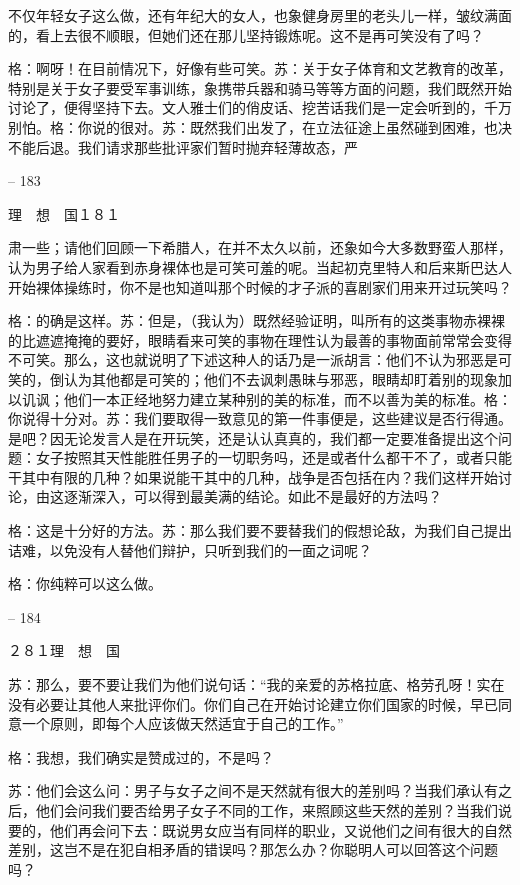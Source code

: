 \documentclass[11pt,oneside]{book}
\begin{document}
\begin{common-format}
    不仅年轻女子这么做，还有年纪大的女人，也象健身房里的老头儿一样，皱纹满面的，看上去很不顺眼，但她们还在那儿坚持锻炼呢。这不是再可笑没有了吗？

    格：啊呀！在目前情况下，好像有些可笑。苏：关于女子体育和文艺教育的改革，特别是关于女子要受军事训练，象携带兵器和骑马等等方面的问题，我们既然开始讨论了，便得坚持下去。文人雅士们的俏皮话、挖苦话我们是一定会听到的，千万别怕。格：你说的很对。苏：既然我们出发了，在立法征途上虽然碰到困难，也决不能后退。我们请求那些批评家们暂时抛弃轻薄故态，严

    

-- 183

    理　想　国１８１

    肃一些；请他们回顾一下希腊人，在并不太久以前，还象如今大多数野蛮人那样，认为男子给人家看到赤身裸体也是可笑可羞的呢。当起初克里特人和后来斯巴达人开始裸体操练时，你不是也知道叫那个时候的才子派的喜剧家们用来开过玩笑吗？

    格：的确是这样。苏：但是，（我认为）既然经验证明，叫所有的这类事物赤裸裸的比遮遮掩掩的要好，眼睛看来可笑的事物在理性认为最善的事物面前常常会变得不可笑。那么，这也就说明了下述这种人的话乃是一派胡言：他们不认为邪恶是可笑的，倒认为其他都是可笑的；他们不去讽刺愚昧与邪恶，眼睛却盯着别的现象加以讥讽；他们一本正经地努力建立某种别的美的标准，而不以善为美的标准。格：你说得十分对。苏：我们要取得一致意见的第一件事便是，这些建议是否行得通。是吧？因无论发言人是在开玩笑，还是认认真真的，我们都一定要准备提出这个问题：女子按照其天性能胜任男子的一切职务吗，还是或者什么都干不了，或者只能干其中有限的几种？如果说能干其中的几种，战争是否包括在内？我们这样开始讨论，由这逐渐深入，可以得到最美满的结论。如此不是最好的方法吗？

    格：这是十分好的方法。苏：那么我们要不要替我们的假想论敌，为我们自己提出诘难，以免没有人替他们辩护，只听到我们的一面之词呢？

    格：你纯粹可以这么做。

    

-- 184

    ２８１理　想　国

    苏：那么，要不要让我们为他们说句话：“我的亲爱的苏格拉底、格劳孔呀！实在没有必要让其他人来批评你们。你们自己在开始讨论建立你们国家的时候，早已同意一个原则，即每个人应该做天然适宜于自己的工作。”

    格：我想，我们确实是赞成过的，不是吗？

    苏：他们会这么问：男子与女子之间不是天然就有很大的差别吗？当我们承认有之后，他们会问我们要否给男子女子不同的工作，来照顾这些天然的差别？当我们说要的，他们再会问下去：既说男女应当有同样的职业，又说他们之间有很大的自然差别，这岂不是在犯自相矛盾的错误吗？那怎么办？你聪明人可以回答这个问题吗？


\end{common-format}
\end{document}
